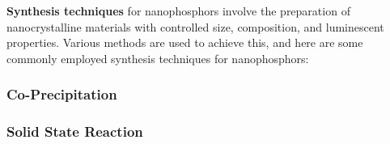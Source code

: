 \documentclass[../synthesisAndCharacter.tex]{subfiles}
\begin{document}
    \textbf{Synthesis techniques} for nanophosphors involve the preparation of nanocrystalline materials with controlled size, 
    composition, and luminescent properties. Various methods are used to achieve this, and here are some commonly 
    employed synthesis techniques for nanophosphors:

    \subsubsection{Co-Precipitation}
        
    
    \subsubsection{Solid State Reaction}
        
\end{document}
